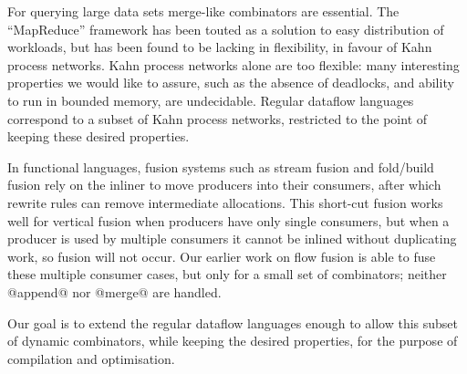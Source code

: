 For querying large data sets merge-like combinators are essential.
The ``MapReduce'' framework has been touted as a solution to easy distribution of workloads, but has been found to be lacking in flexibility\cite{vrba2009kahn}, in favour of Kahn process networks.
Kahn process networks alone are too flexible: many interesting properties we would like to assure, such as the absence of deadlocks, and ability to run in bounded memory, are undecidable.
Regular dataflow languages correspond to a subset of Kahn process networks, restricted to the point of keeping these desired properties\cite{thies2009language}.

In functional languages, fusion systems such as stream fusion\cite{coutts2007stream} and fold/build fusion\cite{jones2001playing} rely on the inliner to move producers into their consumers, after which rewrite rules can remove intermediate allocations.
This short-cut fusion works well for vertical fusion when producers have only single consumers, but when a producer is used by multiple consumers it cannot be inlined without duplicating work, so fusion will not occur.
Our earlier work on flow fusion\cite{lippmeier2013data} is able to fuse these multiple consumer cases, but only for a small set of combinators; neither @append@ nor @merge@ are handled.

Our goal is to extend the regular dataflow languages enough to allow this subset of dynamic combinators, while keeping the desired properties, for the purpose of compilation and optimisation.



